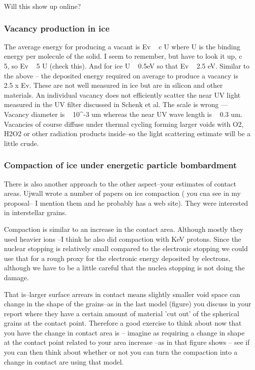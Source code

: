 \documentclass[11pt]{article} %
\begin{document}
Will this show up online?
	

\subsubsection{Vacancy production in ice}
	The average energy for producing a vacant is Ev ~ c U where U is the binding energy per molecule of the solid. I seem to remember, but have to look it up, c~ 5, so Ev ~ 5  U (check this). And for ice U ~ 0.5eV  so that Ev ~ 2.5 eV. Similar to the above -- the deposited energy required on average to produce a vacancy is ~ 2.5 x Ev. These are not well measured in ice but are in silicon and other materials.
	An individual vacancy does not efficiently scatter the near UV light measured in the UV filter discussed in Schenk et al. The scale is wrong --- Vacancy diameter  is  ~ 10^-3 um whereas the near UV wave length is  ~ 0.3 um. Vacancies of course diffuse under thermal cycling forming larger voids with O2, H2O2 or other radiation products inside--so the light scattering estimate will be a little crude. 
	
\subsubsection{Compaction of ice under energetic particle bombardment}

There is also another approach to the other aspect--your estimates of contact areas. Ujwall wrote a number of papers on ice compaction ( you cna see in my proposal-- I mention them and he probably has a web site). They were interested in interstellar grains.

Compaction is similar to an increase in the contact area. Although mostly they  used heavier ions --I think he also did compaction with KeV protons. Since the nuclear stopping is relatively small compared to the electronic stopping we could use that for a rough proxy for the electronic energy deposited by electrons, although we have to be a little careful that the nuclea stopping is not doing the damage.

That is--larger surface arrears in contact means slightly smaller void space can change in the shape of the grains--as in the last model (figure) you discuss in your report where they have a certain amount of material 'cut out' of the spherical grains at the contact point. Therefore a good exercise to think about now that you have the change in contact area is -- imagine as requiring a change in shape at the contact point related to your area increase --as in that figure shows -- see if you can then think about whether or not you can turn the compaction into a change in contact are using that model.
	
\end{document}
